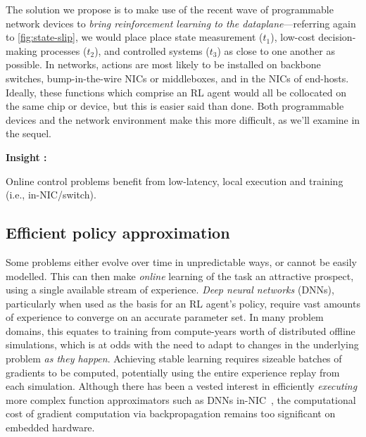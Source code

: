 \documentclass[sigconf,natbib=false]{acmart}
\newcounter{insightc}
\newenvironment{insight}
	{
		\begin{tipblock}\refstepcounter{insightc}\textbf{Insight \theinsightc:}\em
	}
	{
		\end{tipblock}
	}
\begin{document}

The solution we propose is to make use of the recent wave of programmable network devices to \emph{bring reinforcement learning to the dataplane}---referring again to \cref{fig:state-slip}, we would place place state measurement ($t_1$), low-cost decision-making processes ($t_2$), and controlled systems ($t_3$) as close to one another as possible.
In networks, actions are most likely to be installed on backbone switches, bump-in-the-wire NICs or middleboxes, and in the NICs of end-hosts.
Ideally, these functions which comprise an RL agent would all be collocated on the same chip or device, but this is easier said than done. 
Both programmable devices and the network environment make this more difficult, as we'll examine in the sequel.

\begin{insight}
	Online control problems benefit from low-latency, local execution and training (i.e., in-NIC/switch).
\end{insight}

\subsection{Efficient policy approximation}
Some problems either evolve over time in unpredictable ways, or cannot be easily modelled.
This can then make \emph{online} learning of the task an attractive prospect, using a single available stream of experience.
\emph{Deep neural networks} (DNNs), particularly when used as the basis for an RL agent's policy, require vast amounts of experience to converge on an accurate parameter set.
In many problem domains, this equates to training from compute-years worth of distributed offline simulations, which is at odds with the need to adapt to changes in the underlying problem \emph{as they happen}.
Achieving stable learning requires sizeable batches of gradients to be computed, potentially using the entire experience replay from each simulation.
Although there has been a vested interest in efficiently \emph{executing} more complex function approximators such as DNNs in-NIC~\parencite{DBLP:journals/corr/abs-2002-08987,DBLP:journals/corr/abs-2009-02353,DBLP:conf/sigcomm/SanvitoSB18,DBLP:journals/corr/abs-1801-05731,langlet-ml-netronome}, the computational cost of gradient computation via backpropagation remains too significant on embedded hardware.

\end{document}
